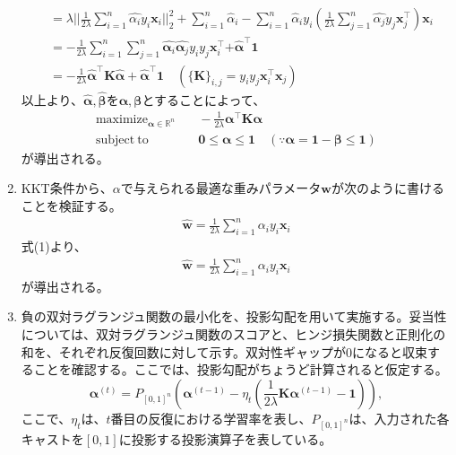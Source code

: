 \documentclass{jsarticle}
\begin{document}
\begin{enumerate}
\begin{align*}
    &= \lambda||\frac{1}{2\lambda}\sum_{i=1}^n\hat{\alpha_i}y_i\bm x_i||_2^2 
    + \sum_{i=1}^n \hat\alpha_i
    - \sum_{i=1}^n \hat\alpha_iy_i\left(\frac{1}{2\lambda}\sum_{j=1}^n\hat{\alpha_j}y_j\bm x_j^\top\right)\bm x_i \\
    &= -\frac{1}{2\lambda}\sum_{i=1}^n\sum_{j=1}^n\hat{\bm\alpha_i}\hat{\bm\alpha_j}y_iy_j\bm x_i^\top\bm + \hat{\bm\alpha}^\top\bm1 \\
    &= -\frac{1}{2\lambda}\hat{\bm\alpha}^\top\bm K\hat{\bm\alpha}+\hat{\bm\alpha}^\top\bm1\quad\left(\{\bm K\}_{i,j}=y_iy_j\bm x_i^\top\bm x_j\right)
  \end{align*}
  以上より、$\hat{\bm\alpha},\hat{\bm\beta}$を$\bm\alpha,\bm\beta$とすることによって、
  \begin{align*}
    \mathrm{maximize}_{\bm \alpha\in\mathbb{R}^n}&\quad -\frac{1}{2\lambda}\bm\alpha^\top\bm K\bm\alpha \\
    \mathrm{subject\ to}&\quad \bm0\le\bm\alpha\le\bm1\quad(\because \bm\alpha = \bm1-\bm\beta\le\bm1)
  \end{align*}
  が導出される。

  \item KKT条件から、$\alpha$で与えられる最適な重みパラメータ$\bm w$が次のように書けることを検証する。
  \begin{align*}
    \hat{\bm w} = \frac{1}{2\lambda}\sum_{i=1}^n \alpha_iy_i\bm x_i
  \end{align*}
  式(1)より、
  \begin{align*}
    \hat{\bm w} = \frac{1}{2\lambda}\sum_{i=1}^n \alpha_iy_i\bm x_i
  \end{align*}
  が導出される。

  \item 負の双対ラグランジュ関数の最小化を、投影勾配を用いて実施する。妥当性については、双対ラグランジュ関数のスコアと、ヒンジ損失関数と正則化の和を、それぞれ反復回数に対して示す。双対性ギャップが0になると収束することを確認する。ここでは、投影勾配がちょうど計算されると仮定する。
  $$
  \bm\alpha^{(t)} = P_{[0,1]^n} \left(\bm\alpha^{(t−1)} − \eta_t\left(\frac{1}{2\lambda}\bm K\bm\alpha^{(t−1)} − \bm 1\right)\right),
  $$
  ここで、$\eta_t$は、$t$番目の反復における学習率を表し、$P_{[0,1]^n}$は、入力された各キャストを$[0,1]$に投影する投影演算子を表している。
\end{enumerate}
\end{document}
